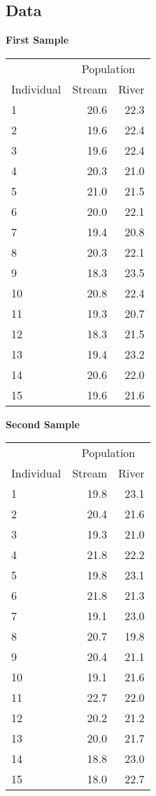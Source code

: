 \documentclass[12pt]{exam}
\begin{document}
\subsection*{Data}

\begin{multicols}{2}

\textbf{First Sample}

\begin{tabular}{@{}lrr@{}}
\toprule
& \multicolumn{2}{c}{Population} \\
\cmidrule(l){2-3}
Individual & Stream & River \\
\midrule
1	& 20.6	& 22.3 \\
2	& 19.6	& 22.4 \\
3	& 19.6	& 22.4 \\
4	& 20.3	& 21.0 \\
5	& 21.0	& 21.5 \\
6	& 20.0	& 22.1 \\
7	& 19.4	& 20.8 \\
8	& 20.3	& 22.1 \\
9	& 18.3	& 23.5 \\
10	& 20.8	& 22.4 \\
11	& 19.3	& 20.7 \\
12	& 18.3	& 21.5 \\
13	& 19.4	& 23.2 \\
14	& 20.6	& 22.0 \\
15	& 19.6	& 21.6 \\
\bottomrule
\end{tabular}

\columnbreak

\textbf{Second Sample}

\begin{tabular}{@{}lrr@{}}
\toprule
& \multicolumn{2}{c}{Population} \\
\cmidrule(l){2-3}
Individual & Stream & River \\
\midrule
1	& 19.8	& 23.1 \\
2	& 20.4	& 21.6 \\
3	& 19.3	& 21.0 \\
4	& 21.8	& 22.2 \\
5	& 19.8	& 23.1 \\
6	& 21.8	& 21.3 \\
7	& 19.1	& 23.0 \\
8	& 20.7	& 19.8 \\
9	& 20.4	& 21.1 \\
10	& 19.1	& 21.6 \\
11	& 22.7	& 22.0 \\
12	& 20.2	& 21.2 \\
13	& 20.0	& 21.7 \\
14	& 18.8	& 23.0 \\
15	& 18.0	& 22.7 \\
\bottomrule
\end{tabular}

\end{multicols}
\end{document}
